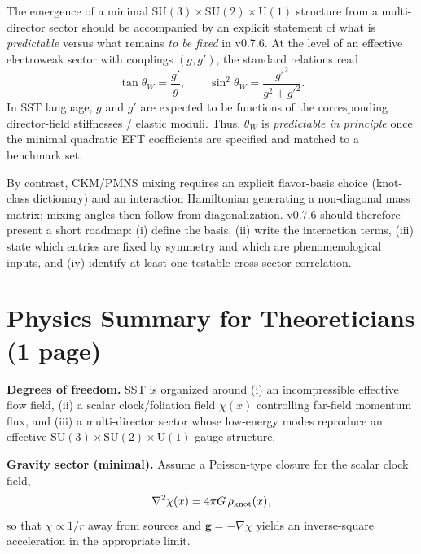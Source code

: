 \documentclass[10pt]{article}
\begin{document}
The emergence of a minimal $\mathrm{SU}(3)\times\mathrm{SU}(2)\times\mathrm{U}(1)$
structure from a multi-director sector should be accompanied by an explicit statement
of what is \emph{predictable} versus what remains \emph{to be fixed} in v0.7.6.
At the level of an effective electroweak sector with couplings $(g,g')$, the standard
relations read
\begin{equation}
\tan\theta_W=\frac{g'}{g},
\qquad
\sin^2\theta_W=\frac{g'^2}{g^2+g'^2}.
\end{equation}
In SST language, $g$ and $g'$ are expected to be functions of the corresponding
director-field stiffnesses / elastic moduli. Thus, $\theta_W$ is \emph{predictable
in principle} once the minimal quadratic EFT coefficients are specified and matched
to a benchmark set.

By contrast, CKM/PMNS mixing requires an explicit flavor-basis choice (knot-class
dictionary) and an interaction Hamiltonian generating a non-diagonal mass matrix;
mixing angles then follow from diagonalization. v0.7.6 should therefore present a
short roadmap: (i) define the basis, (ii) write the interaction terms, (iii) state
which entries are fixed by symmetry and which are phenomenological inputs, and (iv)
identify at least one testable cross-sector correlation.


\section{Physics Summary for Theoreticians (1 page)}
\label{sec:v076-theory-summary}

\noindent\textbf{Degrees of freedom.}
SST is organized around (i) an incompressible effective flow field,
(ii) a scalar clock/foliation field $\chi(x)$ controlling far-field momentum flux,
and (iii) a multi-director sector whose low-energy modes reproduce an effective
$\mathrm{SU}(3)\times\mathrm{SU}(2)\times\mathrm{U}(1)$ gauge structure.

\medskip
\noindent\textbf{Gravity sector (minimal).}
Assume a Poisson-type closure for the scalar clock field,
\begin{equation}
\nabla^2 \chi(x) = 4\pi G\,\rho_{\rm knot}(x),
\end{equation}
so that $\chi \propto 1/r$ away from sources and $\mathbf{g}=-\nabla\chi$ yields an inverse-square
acceleration in the appropriate limit.
\end{document}
